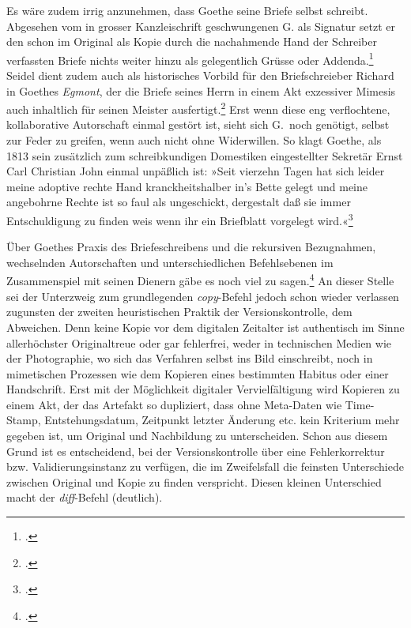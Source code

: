 \documentclass[a4paper,11pt]{article}
\newcommand{\anf}[1]{»#1«}
\begin{document}
Es wäre zudem irrig anzunehmen, dass Goethe seine Briefe selbst schreibt. Abgesehen vom in grosser Kanzleischrift geschwungenen G. als Signatur setzt er den schon im Original als Kopie durch die nachahmende Hand der Schreiber verfassten Briefe nichts weiter hinzu als gelegentlich Grüsse oder Addenda.\footcite[40]{schleif:1965} Seidel dient zudem auch als historisches Vorbild für den Briefschreieber Richard in Goethes \emph{Egmont}, der die Briefe seines Herrn in einem Akt exzessiver Mimesis auch inhaltlich für seinen Meister ausfertigt.\footcite[Vgl.][253–256]{krajewski:2010} Erst wenn diese eng verflochtene, kollaborative Autorschaft einmal gestört ist, sieht sich G.\ noch genötigt, selbst zur Feder zu greifen, wenn auch nicht ohne Widerwillen. So klagt Goethe, als 1813 sein zusätzlich zum schreibkundigen Domestiken eingestellter Sekretär Ernst Carl Christian John einmal unpäßlich ist: \anf{Seit vierzehn Tagen hat sich leider meine adoptive rechte Hand kranckheitshalber in's Bette gelegt und meine angebohrne Rechte ist so faul als ungeschickt, dergestalt daß sie immer Entschuldigung zu finden weis wenn ihr ein Briefblatt  vorgelegt wird.}\footcite[][Nachträge: Briefe, Bd.~51, S.~342]{goethe:1887}

Über Goethes Praxis des Briefeschreibens und die rekursiven Bezugnahmen, wechselnden Autorschaften und unterschiedlichen Befehlsebenen im Zusammenspiel mit seinen Dienern gäbe es noch viel zu sagen.\footcites[Vgl.][]{krajewski:2010}[sowie][]{schoene:2015} An dieser Stelle sei der Unterzweig zum grundlegenden \emph{copy}-Befehl jedoch schon wieder verlassen zugunsten der zweiten heuristischen Praktik der Versionskontrolle, dem Abweichen. Denn keine Kopie vor dem digitalen Zeitalter ist authentisch im Sinne allerhöchster Originaltreue oder gar fehlerfrei, weder in technischen Medien wie der Photographie, wo sich das Verfahren selbst ins Bild einschreibt, noch in mimetischen Prozessen wie dem Kopieren eines bestimmten Habitus oder einer Handschrift. Erst mit der Möglichkeit digitaler Vervielfältigung wird Kopieren zu einem Akt, der das Artefakt so dupliziert, dass ohne Meta-Daten wie Time-Stamp, Entstehungsdatum, Zeitpunkt letzter Änderung etc. kein Kriterium mehr gegeben ist, um Original und Nachbildung zu unterscheiden. Schon aus diesem Grund ist es entscheidend, bei der Versionskontrolle über eine Fehlerkorrektur bzw. Validierungsinstanz zu verfügen, die im Zweifelsfall die feinsten Unterschiede zwischen Original und Kopie zu finden verspricht. Diesen kleinen Unterschied macht der \emph{diff}-Befehl (deutlich).
\end{document}
